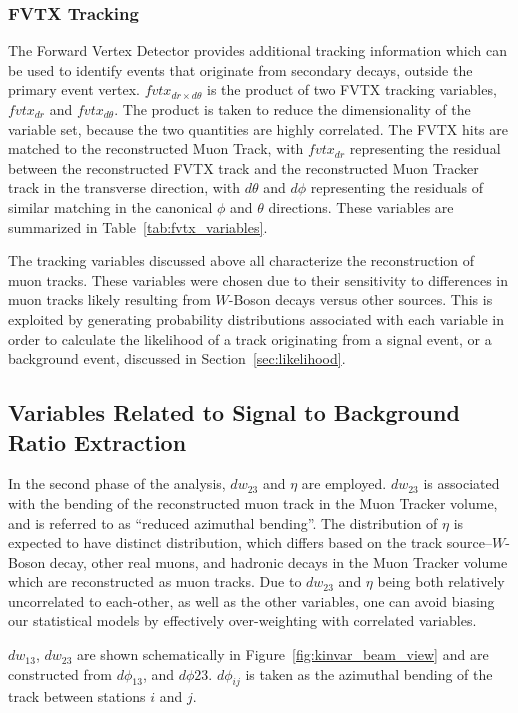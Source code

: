\subsubsection{FVTX Tracking}
The Forward Vertex Detector provides additional tracking information which can
be used to identify events that originate from secondary decays, outside the
primary event vertex. $fvtx_{dr \times d\theta}$ is the product of two FVTX
tracking variables, $fvtx_{dr}$ and $fvtx_{d\theta}$. The product is taken to
reduce the dimensionality of the variable set, because the two quantities are
highly correlated. The FVTX hits are matched to the reconstructed Muon Track,
with $fvtx_{dr}$ representing the residual between the reconstructed FVTX track
and the reconstructed Muon Tracker track in the transverse direction, with
$d\theta$ and $d\phi$ representing the residuals of similar matching in the
canonical $\phi$ and $\theta$ directions. These variables are summarized in
Table~\ref{tab:fvtx_variables}.

The tracking variables discussed above all characterize the reconstruction of
muon tracks. These variables were chosen due to their sensitivity to differences
in muon tracks likely resulting from $W$-Boson decays versus other sources. This
is exploited by generating probability distributions associated with each
variable in order to calculate the likelihood of a track originating from a
signal event, or a background event, discussed in Section~\ref{sec:likelihood}.

\subsection{Variables Related to Signal to Background Ratio Extraction}
\label{sec:dataset_part_2}

In the second phase of the analysis, $dw_{23}$ and $\eta$ are employed.
$dw_{23}$ is associated with the bending of the reconstructed muon track in the
Muon Tracker volume, and is referred to as ``reduced azimuthal bending''. The
distribution of $\eta$ is expected to have distinct distribution, which differs
based on the track source--$W$-Boson decay, other real muons, and hadronic
decays in the Muon Tracker volume which are reconstructed as muon tracks. Due to
$dw_{23}$ and $\eta$ being both relatively uncorrelated to each-other, as well
as the other variables, one can avoid biasing our statistical models by
effectively over-weighting with correlated variables.

$dw_{13}$, $dw_{23}$ are shown schematically in
Figure~\ref{fig:kinvar_beam_view} and are constructed from $d\phi_{13}$, and
$d\phi{23}$.  $d\phi_{ij}$ is taken as the azimuthal bending of the track
between stations $i$ and $j$. 


